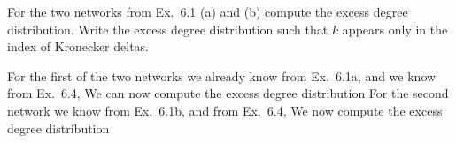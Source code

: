 
For the two networks from Ex.~6.1 (a) and (b) compute the excess degree distribution. Write the excess degree distribution such that $k$ appears only in the index of Kronecker deltas.

\solution
For the first of the two networks we already know from Ex.~6.1a, 
and we know from Ex.~6.4,
We can now compute the excess degree distribution
For the second network we know from Ex.~6.1b,
and from Ex.~6.4, 
We now compute the excess degree distribution 

